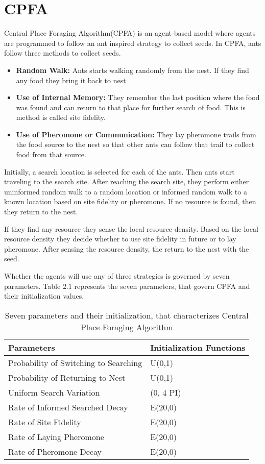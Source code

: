 \section{\label{section:CPFA}CPFA}
Central Place Foraging Algorithm(CPFA) is an agent-based model where agents are programmed to follow an ant inspired strategy to collect seeds. In CPFA, ants follow three methods to collect seeds\cite{hecker2015beyond}.
\begin{itemize}
	\item \textbf{Random Walk:} Ants starts walking randomly from the nest. If they find any food they bring it back to nest
	\item \textbf{Use of Internal Memory:} They remember the last position where the food was found and can return to that place for further search of food. This is method is called site fidelity.
	\item \textbf{Use of Pheromone or Communication:} They lay  pheromone trails from the food source to the nest so that other ants can follow that trail to collect food from that source.	
\end{itemize} 
Initially, a search location is selected for each of the ants. Then ants start traveling to the search site. After reaching the search site, they perform either uninformed random walk to a random location or informed random walk to a known location based on site fidelity or pheromone. If no resource is found, then they return to the nest.\par
If they find any resource they sense the local resource density. Based on the local resource density they decide whether to use site fidelity in future or to lay pheromone. After sensing the resource density, the return to the nest with the seed.\par
Whether the agents will use any of three strategies is governed by seven parameters. Table $2.1$ represents the seven parameters, that govern CPFA and their initialization values\cite{hecker2015beyond}.\par
\begin{table}[h]
	\begin{tabular}{ |p{}|p{}| } 
		\hline
		\textbf{Parameters} & \textbf{Initialization Functions} \\
		\hline 
		Probability of Switching to Searching & U(0,1)\\ 
		\hline
		Probability of Returning to Nest & U(0,1)\\ 
		\hline
		Uniform Search Variation & (0, 4 PI)\\
		\hline
		Rate of Informed Searched Decay & E(20,0)\\
		\hline
		Rate of Site Fidelity & E(20,0)\\
		\hline
		Rate of Laying Pheromone & E(20,0)\\
		\hline
		Rate of Pheromone Decay & E(20,0)\\
		\hline
	\end{tabular}
	\caption{Seven parameters and their initialization, that characterizes Central Place Foraging Algorithm}
\end{table}
